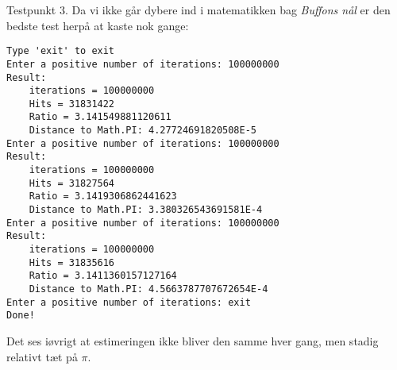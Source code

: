 	Testpunkt 3. Da vi ikke går dybere ind i matematikken bag \emph{Buffons nål} er den bedste test herpå at kaste nok gange:
	\begin{lstlisting}[caption==Output fra testsekvens 2]
Type 'exit' to exit
Enter a positive number of iterations: 100000000
Result: 
 	iterations = 100000000
	Hits = 31831422
	Ratio = 3.141549881120611
	Distance to Math.PI: 4.27724691820508E-5
Enter a positive number of iterations: 100000000
Result: 
 	iterations = 100000000
	Hits = 31827564
	Ratio = 3.1419306862441623
	Distance to Math.PI: 3.380326543691581E-4
Enter a positive number of iterations: 100000000
Result: 
 	iterations = 100000000
	Hits = 31835616
	Ratio = 3.1411360157127164
	Distance to Math.PI: 4.5663787707672654E-4
Enter a positive number of iterations: exit
Done!
	\end{lstlisting}
	Det ses iøvrigt at estimeringen ikke bliver den samme hver gang, men stadig relativt tæt på $\pi$.
